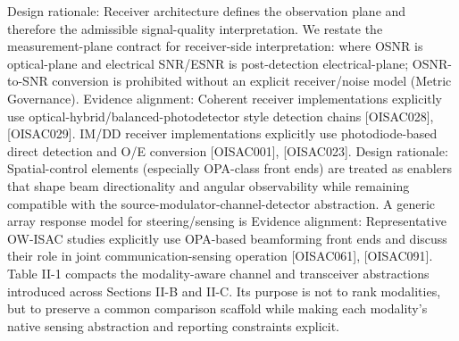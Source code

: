 {}Design rationale: Receiver architecture defines the observation plane and therefore the admissible signal-quality interpretation.\markdownRendererParagraphSeparator
{}We restate the measurement-plane contract for receiver-side interpretation:\markdownRendererSoftLineBreak
{}\markdownRendererSoftLineBreak
{}where OSNR is optical-plane and electrical SNR/ESNR is post-detection electrical-plane; OSNR-to-SNR conversion is prohibited without an explicit receiver/noise model (Metric Governance).\markdownRendererParagraphSeparator
{}Evidence alignment: Coherent receiver implementations explicitly use optical-hybrid/balanced-photodetector style detection chains [O\markdownRendererUnderscore{}ISAC\markdownRendererUnderscore{}028], [O\markdownRendererUnderscore{}ISAC\markdownRendererUnderscore{}029]. IM/DD receiver implementations explicitly use photodiode-based direct detection and O/E conversion [O\markdownRendererUnderscore{}ISAC\markdownRendererUnderscore{}001], [O\markdownRendererUnderscore{}ISAC\markdownRendererUnderscore{}023].\markdownRendererInterblockSeparator
{}
\markdownRendererSectionEnd \markdownRendererSectionBegin
{}\markdownRendererInterblockSeparator
{}Design rationale: Spatial-control elements (especially OPA-class front ends) are treated as enablers that shape beam directionality and angular observability while remaining compatible with the source-modulator-channel-detector abstraction.\markdownRendererParagraphSeparator
{}A generic array response model for steering/sensing is\markdownRendererSoftLineBreak
{}\markdownRendererParagraphSeparator
{}Evidence alignment: Representative OW-ISAC studies explicitly use OPA-based beamforming front ends and discuss their role in joint communication-sensing operation [O\markdownRendererUnderscore{}ISAC\markdownRendererUnderscore{}061], [O\markdownRendererUnderscore{}ISAC\markdownRendererUnderscore{}091].\markdownRendererParagraphSeparator
{}Table II-1 compacts the modality-aware channel and transceiver abstractions introduced across Sections II-B and II-C. Its purpose is not to rank modalities, but to preserve a common comparison scaffold while making each modality's native sensing abstraction and reporting constraints explicit.\markdownRendererParagraphSeparator
{}\markdownRendererInterblockSeparator

